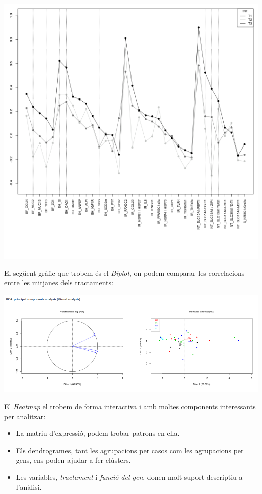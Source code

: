 \documentclass[english]{article}
\begin{document}
\begin{center}
\includegraphics[scale=0.4]{app9.png}
\end{center}
\clearpage
El següent gràfic que trobem és el \textit{Biplot}, on podem comparar les correlacions entre les mitjanes dels tractaments:
\begin{center}
\includegraphics[scale=0.5]{app5.png}
\end{center}
El \textit{Heatmap} el trobem de forma interactiva i amb moltes components interessants per analitzar:
\begin{itemize}
\item La matriu d'expressió, podem trobar patrons en ella.
\item Els dendrogrames, tant les agrupacions per casos com les agrupacions per gens, ens poden ajudar a fer clústers.
\item Les variables, \textit{tractament} i \textit{funció del gen}, donen molt suport descriptiu a l'anàlisi.
\end{itemize}
\end{document}
